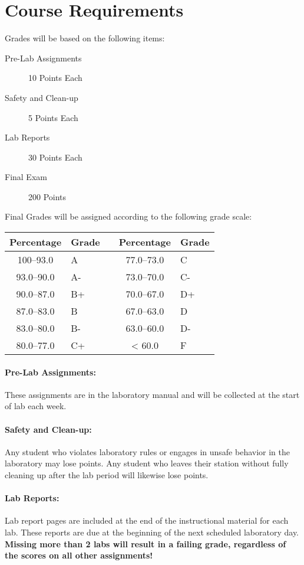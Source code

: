 \documentclass[12pt, letterpaper]{article}
\begin{document}
\section*{Course Requirements}
Grades will be based on the following items:
\begin{description}
  \item[Pre-Lab Assignments] 10 Points Each
  \item[Safety and Clean-up] 5 Points Each
  \item[Lab Reports] 30 Points Each
  \item[Final Exam] 200 Points
\end{description}
Final Grades will be assigned according to the following grade scale:

\begin{tabular}{cl|c|cl}
	Percentage & Grade &  & Percentage & Grade \\ \midrule
	100--93.0 & A     &  &  77.0--73.0 & C     \\
	93.0--90.0 & A-    &  &  73.0--70.0 & C-    \\
	90.0--87.0 & B+    &  &  70.0--67.0 & D+    \\
	87.0--83.0 & B     &  &  67.0--63.0 & D     \\
	83.0--80.0 & B-    &  &  63.0--60.0 & D-    \\
	80.0--77.0 & C+    &  &     < 60.0 & F
\end{tabular}
\paragraph{Pre-Lab Assignments:}
These assignments are in the laboratory manual and will be collected at the start of lab each week.

\paragraph{Safety and Clean-up:}
Any student who violates laboratory rules or engages in unsafe behavior in the laboratory may lose points. Any student who leaves their station without fully cleaning up after the lab period will likewise lose points.

\paragraph{Lab Reports:}
Lab report pages are included at the end of the instructional material for each lab. These reports are due at the beginning of the next scheduled laboratory day. {\bfseries Missing more than 2 labs will result in a failing grade, regardless of the scores on all other assignments!}
\end{document}
